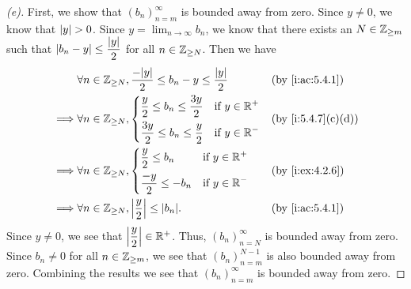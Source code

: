 \begin{proof}[(e)]
  First, we show that \((b_n)_{n = m}^\infty\) is bounded away from zero.
  Since \(y \neq 0\), we know that \(\left\lvert y\right\rvert > 0\).
  Since \(y = \lim_{n \to \infty} b_n\), we know that there exists an \(N \in \mathbb{Z}_{\geq m}\) such that \(\left\lvert b_n - y\right\rvert \leq \dfrac{\left\lvert y\right\rvert}{2}\) for all \(n \in \mathbb{Z}_{\geq N}\).
  Then we have
  \begin{align*}
             & \forall n \in \Z_{\geq N}, \dfrac{-\abs{y}}{2} \leq b_n - y \leq \dfrac{\abs{y}}{2} &  & \by{i:ac:5.4.1} \\
    \implies & \forall n \in \Z_{\geq N}, \begin{dcases}
                                            \dfrac{y}{2} \leq b_n \leq \dfrac{3y}{2} & \text{if } y \in \R^+ \\
                                            \dfrac{3y}{2} \leq b_n \leq \dfrac{y}{2} & \text{if } y \in \R^-
                                          \end{dcases}                 &  & \by{i:5.4.7}[c,d]              \\
    \implies & \forall n \in \Z_{\geq N}, \begin{dcases}
                                            \dfrac{y}{2} \leq b_n   & \text{if } y \in \R^+ \\
                                            \dfrac{-y}{2} \leq -b_n & \text{if } y \in \R^-
                                          \end{dcases}                                  &  & \by{i:ex:4.2.6}            \\
    \implies & \forall n \in \Z_{\geq N}, \abs{\dfrac{y}{2}} \leq \abs{b_n}.                       &  & \by{i:ac:5.4.1}
  \end{align*}
  Since \(y \neq 0\), we see that \(\left\lvert\dfrac{y}{2}\right\rvert \in \mathbb{R}^+\).
  Thus, \((b_n)_{n = N}^\infty\) is bounded away from zero.
  Since \(b_n \neq 0\) for all \(n \in \mathbb{Z}_{\geq m}\), we see that \((b_n)_{n = m}^{N - 1}\) is also bounded away from zero.
  Combining the results we see that \((b_n)_{n = m}^\infty\) is bounded away from zero.


\end{proof}
